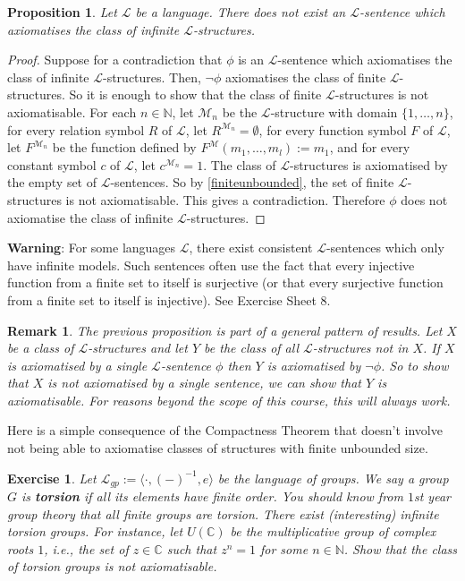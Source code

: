 \documentclass[11pt]{article}
\newtheorem{remark}[theorem]{Remark}
\newtheorem{proposition}[theorem]{Proposition}
\newtheorem{exercise}[theorem]{Exercise}
\newcommand{\mcal}[1]{\mathcal{#1}}
\newcommand{\C}{\mathbb{C}}
\newcommand{\N}{\mathbb{N}}
\begin{document}
\begin{proposition}
Let $\mcal{L}$ be a language. There does not exist an $\mcal{L}$-sentence which axiomatises the class of infinite $\mcal{L}$-structures.
\end{proposition}
\begin{proof}
Suppose for a contradiction that $\phi$ is an $\mcal{L}$-sentence which axiomatises the class of infinite $\mcal{L}$-structures. Then, $\neg\phi$ axiomatises the class of finite $\mcal{L}$-structures. So it is enough to show that the class of finite $\mcal{L}$-structures is not axiomatisable. For each $n\in\N$,
let $\mcal{M}_n$ be the $\mcal{L}$-structure with domain $\{1,\ldots,n\}$, for every relation symbol $R$ of $\mcal{L}$, let $R^{\mcal{M}_n}=\emptyset$, for every function symbol $F$ of $\mcal{L}$, let $F^{\mcal{M}_n}$ be the function defined by $F^\mcal{M}(m_1,\ldots,m_l):=m_1$, and for every constant symbol $c$ of $\mcal{L}$, let $c^{\mcal{M}_n}=1$. The class of $\mcal{L}$-structures is axiomatised by the empty set of $\mcal{L}$-sentences. So by \ref{finiteunbounded}, the set of finite $\mcal{L}$-structures is not axiomatisable. This gives a contradiction. Therefore $\phi$ does not axiomatise the class of infinite $\mcal{L}$-structures.
\end{proof}

\noindent
\textbf{Warning}: For some languages $\mcal{L}$, there exist consistent $\mcal{L}$-sentences which only have infinite models. Such sentences often use the fact that every injective function from a finite set to itself is surjective (or that every surjective function from a finite set to itself is injective). See Exercise Sheet $8$.

\medskip

\begin{remark} The previous proposition is part of a general pattern of results.
Let $X$ be a class of $\mcal{L}$-structures and let $Y$ be the class of all $\mcal{L}$-structures not in $X$. If $X$ is axiomatised by a single $\mcal{L}$-sentence $\phi$ then $Y$ is axiomatised by $\neg\phi$. So to show that $X$ is not axiomatised by a single sentence, we can show that $Y$ is axiomatisable. For reasons beyond the scope of this course, this will always work.
\end{remark}


Here is a simple consequence of the Compactness Theorem that doesn't involve not being able to axiomatise classes of structures with finite unbounded size.
\begin{exercise}
Let $\mcal{L}_{gp}:=\langle \cdot, (-)^{-1}, e \rangle$ be the language of groups. We say a group $G$ is \textbf{torsion} if all its elements have finite order. You should know from $1$st year group theory that all finite groups are torsion. There exist (interesting) infinite torsion groups. For instance, let $U(\mathbb{C})$ be the multiplicative group of complex roots $1$, i.e., the set of $z\in\C$ such that $z^n=1$ for some $n\in\N$. Show that the class of torsion groups is not axiomatisable.
\end{exercise}
\end{document}

